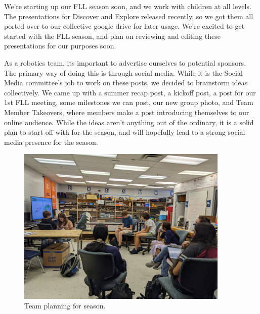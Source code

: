 We're starting up our FLL season soon, and we work with children at all levels. The presentations for Discover and Explore released recently, so we got them all ported over to our collective google drive for later usage. We're excited to get started with the FLL season, and plan on reviewing and editing these presentations for our purposes soon.

As a robotics team, its important to advertise ourselves to potential sponsors. The primary way of doing this is through social media. While it is the Social Media committee's job to work on these posts, we decided to brainstorm ideas collectively. We came up with a summer recap post, a kickoff post, a post for our 1st FLL meeting, some milestones we can post, our new group photo, and Team Member Takeovers, where members make a post introducing themselves to our online audience. While the ideas aren't anything out of the ordinary, it is a solid plan to start off with for the season, and will hopefully lead to a strong social media presence for the season.

\begin{figure}[htp]
\centering
\includegraphics[width=0.9\textwidth, angle=0]{Meetings/August/08-23-22/08-23-22-meeting.jpg}
\caption{Team planning for season.}
\label{fig:082322}
\end{figure}




